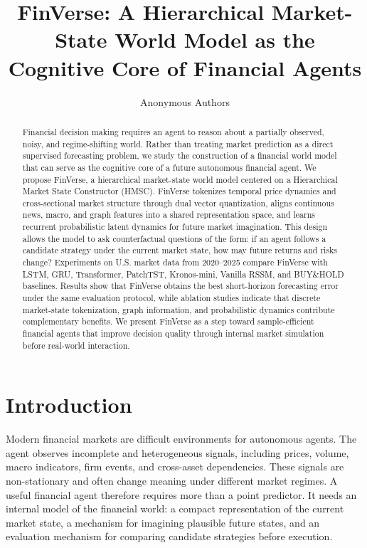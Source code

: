 \documentclass[letterpaper]{article}
\title{FinVerse: A Hierarchical Market-State World Model as the Cognitive Core of Financial Agents}
\author{Anonymous Authors}
\date{}
\begin{document}
\maketitle

\begin{abstract}
Financial decision making requires an agent to reason about a partially observed, noisy, and regime-shifting world. Rather than treating market prediction as a direct supervised forecasting problem, we study the construction of a financial world model that can serve as the cognitive core of a future autonomous financial agent. We propose FinVerse, a hierarchical market-state world model centered on a Hierarchical Market State Constructor (HMSC). FinVerse tokenizes temporal price dynamics and cross-sectional market structure through dual vector quantization, aligns continuous news, macro, and graph features into a shared representation space, and learns recurrent probabilistic latent dynamics for future market imagination. This design allows the model to ask counterfactual questions of the form: if an agent follows a candidate strategy under the current market state, how may future returns and risks change? Experiments on U.S. market data from 2020--2025 compare FinVerse with LSTM, GRU, Transformer, PatchTST, Kronos-mini, Vanilla RSSM, and BUY\&HOLD baselines. Results show that FinVerse obtains the best short-horizon forecasting error under the same evaluation protocol, while ablation studies indicate that discrete market-state tokenization, graph information, and probabilistic dynamics contribute complementary benefits. We present FinVerse as a step toward sample-efficient financial agents that improve decision quality through internal market simulation before real-world interaction.
\end{abstract}

\section{Introduction}
Modern financial markets are difficult environments for autonomous agents. The agent observes incomplete and heterogeneous signals, including prices, volume, macro indicators, firm events, and cross-asset dependencies. These signals are non-stationary and often change meaning under different market regimes. A useful financial agent therefore requires more than a point predictor. It needs an internal model of the financial world: a compact representation of the current market state, a mechanism for imagining plausible future states, and an evaluation mechanism for comparing candidate strategies before execution.
\end{document}
